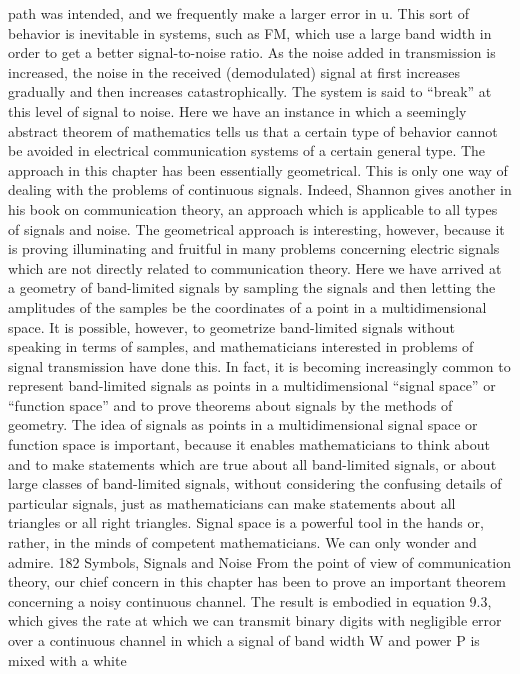 {{{{{{{{{{{path was intended, and we frequently make a larger error in u.
This sort of behavior is inevitable in systems, such as FM, which
use a large band width in order to get a better signal-to-noise ratio.
As the noise added in transmission is increased, the noise in the
received (demodulated) signal at first increases gradually and then
increases catastrophically. The system is said to “break” at this
level of signal to noise. Here we have an instance in which a
seemingly abstract theorem of mathematics tells us that a certain
type of behavior cannot be avoided in electrical communication
systems of a certain general type.
The approach in this chapter has been essentially geometrical.
This is only one way of dealing with the problems of continuous
signals. Indeed, Shannon gives another in his book on communication
theory, an approach which is applicable to all types of
signals and noise. The geometrical approach is interesting, however,
because it is proving illuminating and fruitful in many problems
concerning electric signals which are not directly related to
communication theory.
Here we have arrived at a geometry of band-limited signals by
sampling the signals and then letting the amplitudes of the samples
be the coordinates of a point in a multidimensional space. It is
possible, however, to geometrize band-limited signals without
speaking in terms of samples, and mathematicians interested in
problems of signal transmission have done this. In fact, it is becoming
increasingly common to represent band-limited signals as
points in a multidimensional “signal space” or “function space”
and to prove theorems about signals by the methods of geometry.
The idea of signals as points in a multidimensional signal space
or function space is important, because it enables mathematicians
to think about and to make statements which are true about all
band-limited signals, or about large classes of band-limited signals,
without considering the confusing details of particular signals,
just as mathematicians can make statements about all triangles or
all right triangles. Signal space is a powerful tool in the hands or,
rather, in the minds of competent mathematicians. We can only
wonder and admire.
182
Symbols, Signals and Noise
From the point of view of communication theory, our chief
concern in this chapter has been to prove an important theorem
concerning a noisy continuous channel. The result is embodied in
equation 9.3, which gives the rate at which we can transmit binary
digits with negligible error over a continuous channel in which a
signal of band width W and power P is mixed with a white
}}}}}}}}}}}
